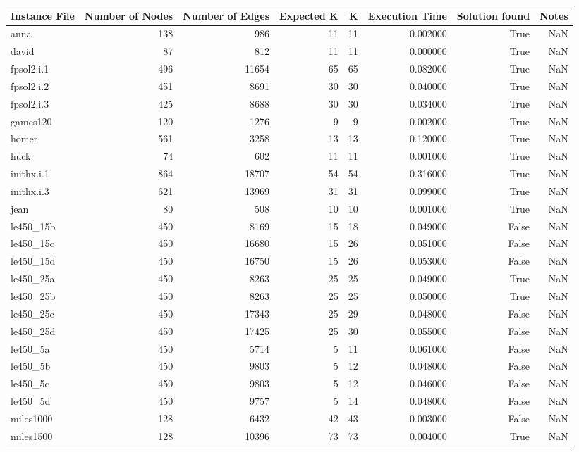 \begin{tabular}{lrrrrrrr}
\toprule
Instance File & Number of Nodes & Number of Edges & Expected K & K & Execution Time & Solution found & Notes \\
\midrule
anna & 138 & 986 & 11 & 11 & 0.002000 & True & NaN \\
david & 87 & 812 & 11 & 11 & 0.000000 & True & NaN \\
fpsol2.i.1 & 496 & 11654 & 65 & 65 & 0.082000 & True & NaN \\
fpsol2.i.2 & 451 & 8691 & 30 & 30 & 0.040000 & True & NaN \\
fpsol2.i.3 & 425 & 8688 & 30 & 30 & 0.034000 & True & NaN \\
games120 & 120 & 1276 & 9 & 9 & 0.002000 & True & NaN \\
homer & 561 & 3258 & 13 & 13 & 0.120000 & True & NaN \\
huck & 74 & 602 & 11 & 11 & 0.001000 & True & NaN \\
inithx.i.1 & 864 & 18707 & 54 & 54 & 0.316000 & True & NaN \\
inithx.i.3 & 621 & 13969 & 31 & 31 & 0.099000 & True & NaN \\
jean & 80 & 508 & 10 & 10 & 0.001000 & True & NaN \\
le450_15b & 450 & 8169 & 15 & 18 & 0.049000 & False & NaN \\
le450_15c & 450 & 16680 & 15 & 26 & 0.051000 & False & NaN \\
le450_15d & 450 & 16750 & 15 & 26 & 0.053000 & False & NaN \\
le450_25a & 450 & 8263 & 25 & 25 & 0.049000 & True & NaN \\
le450_25b & 450 & 8263 & 25 & 25 & 0.050000 & True & NaN \\
le450_25c & 450 & 17343 & 25 & 29 & 0.048000 & False & NaN \\
le450_25d & 450 & 17425 & 25 & 30 & 0.055000 & False & NaN \\
le450_5a & 450 & 5714 & 5 & 11 & 0.061000 & False & NaN \\
le450_5b & 450 & 9803 & 5 & 12 & 0.048000 & False & NaN \\
le450_5c & 450 & 9803 & 5 & 12 & 0.046000 & False & NaN \\
le450_5d & 450 & 9757 & 5 & 14 & 0.048000 & False & NaN \\
miles1000 & 128 & 6432 & 42 & 43 & 0.003000 & False & NaN \\
miles1500 & 128 & 10396 & 73 & 73 & 0.004000 & True & NaN \\

\end{tabular}
